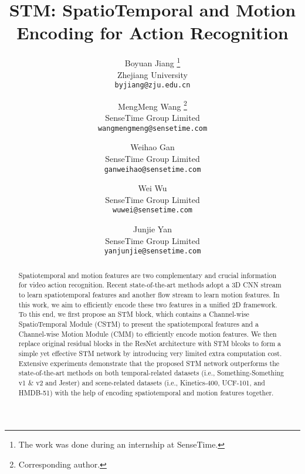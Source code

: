 \documentclass[10pt,twocolumn,letterpaper]{article}
\begin{document}
\title{STM: SpatioTemporal and Motion Encoding for Action Recognition}


\author{Boyuan Jiang \thanks{The work was done during an internship at SenseTime.}\\
Zhejiang University\\
{\tt\small byjiang@zju.edu.cn}
\and
MengMeng Wang \thanks{Corresponding author.}\\
SenseTime Group Limited\\
{\tt\small wangmengmeng@sensetime.com}
\and
Weihao Gan\\
SenseTime Group Limited\\
{\tt\small ganweihao@sensetime.com}
\and
Wei Wu\\
SenseTime Group Limited\\
{\tt\small wuwei@sensetime.com}
\and
Junjie Yan\\
SenseTime Group Limited\\
{\tt\small yanjunjie@sensetime.com}
}

\maketitle
\ificcvfinal\thispagestyle{empty}\fi

\begin{abstract}
Spatiotemporal and motion features are two complementary and crucial information for video action recognition. Recent state-of-the-art methods adopt a 3D CNN stream to learn spatiotemporal features and another flow stream to learn motion features. In this work, we aim to efficiently encode these two features in a unified 2D framework. To this end, we first propose an STM block, which contains a Channel-wise SpatioTemporal Module (CSTM) to present the spatiotemporal features and a Channel-wise Motion Module (CMM) to efficiently encode motion features. We then replace original residual blocks in the ResNet architecture with STM blcoks to form a simple yet effective STM network by introducing very limited extra computation cost. Extensive experiments demonstrate that the proposed STM network outperforms the state-of-the-art methods on both temporal-related datasets (i.e., Something-Something v1 \& v2 and Jester) and scene-related datasets (i.e., Kinetics-400, UCF-101, and HMDB-51) with the help of encoding spatiotemporal and motion features together.
\end{abstract}
\end{document}

